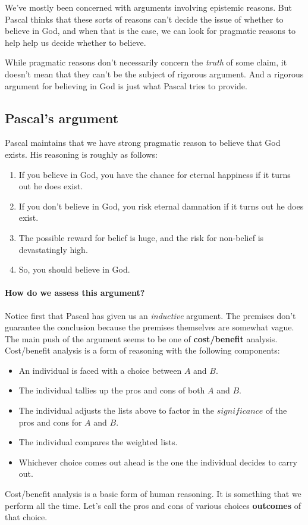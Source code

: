 \documentclass[letterpaper,10pt]{article}
\begin{document}
We've mostly been concerned with arguments involving epistemic reasons.  But Pascal thinks that these sorts of reasons can't decide the issue of whether to believe in God, and when that is the case, we can look for pragmatic reasons to help help us decide whether to believe.

While pragmatic reasons don't necessarily concern the \textit{truth} of some claim, it doesn't mean that they can't be the subject of rigorous argument.  And a rigorous argument for believing in God is just what Pascal tries to provide.

\subsection{Pascal's argument}
Pascal maintains that we have strong pragmatic reason to believe that God exists. His reasoning is roughly as follows:
\begin{enumerate}
 \item If you believe in God, you have the chance for eternal happiness if it turns out he does exist.
 \item If you don't believe in God, you risk eternal damnation if it turns out he does exist.
 \item The possible reward for belief is huge, and the risk for non-belief is devastatingly high.
 \item So, you should believe in God.
\end{enumerate}

\paragraph{How do we assess this argument?} Notice first that Pascal has given us an \textit{inductive} argument.  The premises don't guarantee the conclusion because the premises themselves are somewhat vague. The main push of the argument seems to be one of \textbf{cost/benefit} analysis. Cost/benefit analysis is a form of reasoning with the following components:
\begin{itemize}
 \item An individual is faced with a choice between $A$ and $B$.
 \item The individual tallies up the pros and cons of both $A$ and $B$.
 \item The individual adjusts the lists above to factor in the $significance$ of the pros and cons for $A$ and $B$.
 \item The individual compares the weighted lists.
 \item Whichever choice comes out ahead is the one the individual decides to carry out.
\end{itemize}
Cost/benefit analysis is a basic form of human reasoning.  It is something that we perform all the time. Let's call the pros and cons of various choices \textbf{outcomes} of that choice.
\end{document}
